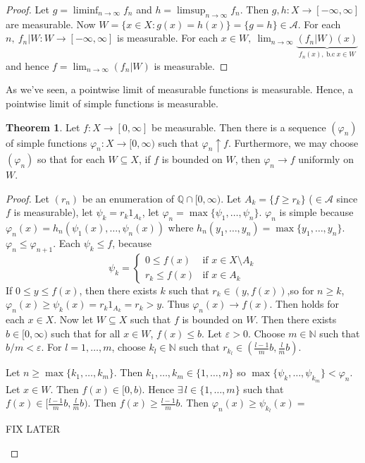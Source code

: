 \documentclass{article}
\newcommand{\Q}{\mathbb{Q}}
\newcommand{\N}{\mathbb{N}}
\theoremstyle{definition}
\newtheorem{theorem}{Theorem}
\begin{document}
\begin{proof}
Let $g = \liminf_{n \to \infty} f_n$ and $h = \limsup_{n \to \infty} f_n$. Then $g,h:X\to [-\infty,\infty]$ are measurable. Now $W = \{x \in X: g(x) = h(x)\} = \{g = h\} \in \mathscr{A}$. For each $n, \ f_n | W: W \to [-\infty,\infty]$ is measurable. For each $x \in W,\ \lim_{n \to \infty} \underbrace{(f_n | W)(x)}_{f_n(x),\ \text{b.c}\ x \in W}$ and hence $f = \lim_{n \to \infty} (f_n | W)$ is measurable.
\end{proof}

As we've seen, a pointwise limit of measurable functions is measurable. Hence, a pointwise limit of simple functions is measurable. 

\begin{theorem}
    Let $f:X \longrightarrow [0, \infty]$ be measurable. Then there is a sequence $(\varphi_n)$ of simple functions $\varphi_n : X \longrightarrow [0, \infty)$ such that $\varphi_n \uparrow f$. Furthermore, we may choose $(\varphi_n)$ so that for each $W \subseteq X$, if $f$ is bounded on $W$, then $\varphi_n \to f$ uniformly on $W$.
\end{theorem}
\begin{proof}
    Let $(r_n)$ be an enumeration of $\Q \cap [0, \infty)$. Let $A_k = \{f \geq r_k\}$ ($\in \mathscr{A}$ since $f$ is measurable), let $\psi_k = r_k 1_{A_k}$, let $\varphi_n = \max\{\psi_1, \ldots, \psi_n\}$. $\varphi_n$ is simple because $\varphi_n(x) = h_n(\psi_1(x), \ldots, \psi_n(x))$ where $h_n(y_1, \ldots, y_n) = \max\{y_1, \ldots, y_n\}$. $\varphi_n \leq \varphi_{n+1}$. Each $\psi_k \leq f$, because
    \[
        \psi_k = \begin{cases}
            0 \leq f(x) & \text{if } x \in X \setminus A_k \\
            r_k \leq f(x) & \text{if } x \in A_k
        \end{cases}
    \]
    If $0 \leq y \leq f(x)$, then there exists $k$ such that $r_k \in (y, f(x))$,so for $n \geq k$, $\varphi_n(x) \geq \psi_k(x)  = r_k 1_{A_k} = r_k > y$. Thus $\varphi_n(x) \to f(x)$. Then holds for each $x \in X$. Now let $W \subseteq X$ such that $f$ is bounded on $W$. Then there exists $b \in [0, \infty)$ such that for all $x \in W$, $f(x) \leq b$. Let $\varepsilon > 0$. Choose $m \in \N$ such that $b/m < \varepsilon$. For $l = 1, \ldots, m$, choose $k_l \in \N$ such that $r_{k_l} \in (\frac{l-1}{m}b, \frac{l}{m}b)$.
    
    Let $n \geq \max\{k_1, \ldots, k_m\}$. Then $k_1, \ldots, k_m \in \{1, \ldots, n\}$ so $\max\{\psi_k, \ldots, \psi_{k_m}\} < \varphi_n$. Let $x \in W$. Then $f(x) \in [0,b)$. Hence $\exists\, l \in \{1,\dots,m\}$ such that $f(x) \in [\frac{l-1}{m}b,\frac{l}{m}b)$. Then $f(x) \geq \frac{l-1}{m}b$. Then $\varphi_n (x) \geq \psi_{k_l} (x) = $ \begin{center}{\huge FIX LATER}\end{center} %
\end{proof}
\end{document}
